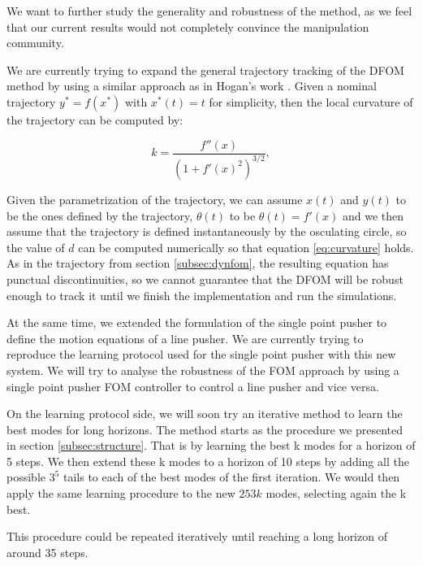 \documentclass[12,twoside]{TFG-GM}
\theoremstyle{definition}
\theoremstyle{remark}
\newcommand{\beq}{\begin{equation}}
\newcommand{\eeq}{\end{equation}}
\begin{document}
We want to further study the generality and robustness of the method, as we feel that our current results would not completely convince the manipulation community.

We are currently trying to expand the general trajectory tracking of the DFOM method by using a similar approach as in Hogan's work \cite{gt1} \cite{gt2}. Given a nominal trajectory $y^* = f(x^*)$ with $x^*(t) = t$ for simplicity, then the local curvature of the trajectory can be computed by:

\beq
k = \frac{f''(x)}{\left( 1 + f'(x)^2 \right)^{3/2}},
\eeq

Given the parametrization of the trajectory, we can assume $x(t)$ and $y(t)$ to be the ones defined by the trajectory, $\theta(t)$ to be $\theta(t) = f'(x)$ and we then assume that the trajectory is defined instantaneously by the osculating circle, so the value of $d$ can be computed numerically so that equation \ref{eq:curvature} holds. As in the trajectory from section \ref{subsec:dynfom}, the resulting equation has punctual discontinuities, so we cannot guarantee that the DFOM will be robust enough to track it until we finish the implementation and run the simulations.

At the same time, we extended the formulation of the single point pusher to define the motion equations of a line pusher. We are currently trying to reproduce the learning protocol used for the single point pusher with this new system. We will try to analyse the robustness of the FOM approach by using a single point pusher FOM controller to control a line pusher and vice versa.


On the learning protocol side, we will soon try an iterative method to learn the best modes for long horizons. The method starts as the procedure we presented in section \ref{subsec:structure}. That is by learning the best k modes for a horizon of 5 steps. We then extend these k modes to a horizon of 10 steps by adding all the possible $3^5$ tails to each of the best modes of the first iteration. We would then apply the same learning procedure to the new $253k$ modes, selecting again the k best.

This procedure could be repeated iteratively until reaching a long horizon of around 35 steps.

\newpage

{}


\end{document}
